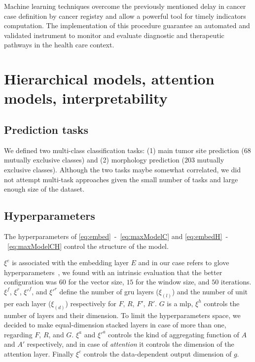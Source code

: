 Machine learning techniques overcome the previously mentioned
delay in cancer case definition by cancer registry and allow a
powerful tool for timely indicators computation. The implementation of
this procedure guarantee an automated and validated instrument to
monitor and evaluate diagnostic and therapeutic pathways in the
health care context.

\section{Hierarchical models, attention models, interpretability}
\label{ch:icdo}

\subsection{Prediction tasks}
We defined two multi-class classification tasks: (1) main tumor site
prediction ($68$ mutually exclusive classes) and (2) morphology
prediction ($203$ mutually exclusive
classes). Although the two tasks maybe somewhat correlated, we did not
attempt multi-task approaches given the small number of tasks and
large enough size of the dataset.


\subsection{Hyperparameters}\label{sec:hyperparameters}
The hyperparameters of \eqref{eq:embed}~-~\eqref{eq:maxModelC}
and \eqref{eq:embedH}~-~\eqref{eq:maxModelCH} control the structure of
the model.

$\xi^e$ is associated with the embedding layer $E$ and in our case
refers to \ac{glove} 
hyperparameters~\cite{pennington_glove:_2014}, we found with an
intrinsic evaluation that the better configuration was $60$ for the vector
size, $15$ for the window size, and $50$ iterations. $\xi^f$,
$\xi^r$, $\xi'^{f}$, and $\xi'^{r}$ define the number of
\ac{gru} layers ($\xi_{(l)}$) and the number of unit per each layer
($\xi_{(d)}$) respectively for $F$, $R$, $F'$, $R'$. 
$G$ is a \ac{mlp}, $\xi^h$ controls the number of
layers and their dimension. To limit the
hyperparameters space, we decided to
make equal-dimension stacked layers in case of more than one,
regarding $F$, $R$, and $G$. $\xi^a$ and $\xi'^a$ controls the
kind of aggregating function of $A$ and $A'$ respectively, and in case
of \emph{attention} 
it controls the dimension of the attention layer. Finally $\xi^c$ controls the
data-dependent output dimension of $g$.


